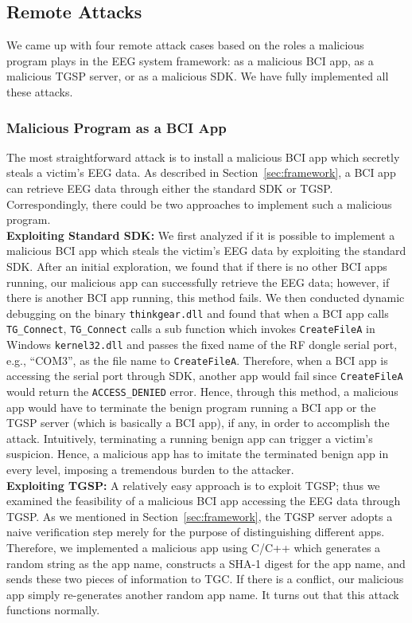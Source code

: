 \subsection{Remote Attacks}
We came up with four remote attack cases based on the roles a malicious program plays in the EEG system framework: as a malicious BCI app, as a malicious TGSP server, or as a malicious SDK. We have fully implemented all these attacks. 

\subsubsection{Malicious Program as a BCI App}
The most straightforward attack is to install a malicious BCI app which secretly steals a victim's EEG data. As described in Section~\ref{sec:framework}, a BCI app can retrieve EEG data through either the standard SDK or TGSP. Correspondingly, there could be two approaches to implement such a malicious program. \\
\indent \textbf{Exploiting Standard SDK:} We first analyzed  if it is possible to implement a malicious BCI app which steals the victim's EEG data by exploiting the standard SDK. After an initial exploration, we found that if there is no other BCI apps running, our malicious app can successfully retrieve the EEG data; however, if there is another BCI app running, this method fails. We then  conducted dynamic debugging on the binary \texttt{thinkgear.dll} and found that when a BCI app calls \texttt{TG\_Connect}, \texttt{TG\_Connect} calls a sub function which invokes \texttt{CreateFileA} in Windows \texttt{kernel32.dll} and passes the fixed name of the RF dongle serial port, e.g., ``COM3'', as the file name to \texttt{CreateFileA}. Therefore, when a BCI app is accessing the serial port through SDK, another app would fail since \texttt{CreateFileA} would return the \texttt{ACCESS\_DENIED} error. Hence, through this method, a malicious app would have to terminate the benign program running a BCI app or the TGSP server (which is basically a BCI app), if any, in order to accomplish the attack. Intuitively, terminating a running benign app can trigger a victim's suspicion. Hence, a malicious app has to imitate the terminated benign app in every level, imposing a tremendous burden to the attacker. \\
\indent \textbf{Exploiting TGSP:} A relatively easy approach is to exploit TGSP; thus we examined the feasibility of a malicious BCI app accessing the EEG data through TGSP. As we mentioned in Section~\ref{sec:framework}, the TGSP server adopts a naive verification step merely for the purpose of distinguishing different apps. Therefore, we implemented a malicious app using C/C++ which generates a random string as the app name, constructs a SHA-1 digest for the app name, and sends these two pieces of information to TGC. If there is a conflict, our malicious app simply re-generates another random app name. It turns out that this attack functions normally.

